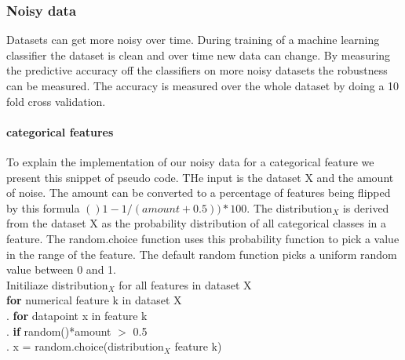 \documentclass[a4paper,10pt]{article}
\begin{document}
\subsubsection{Noisy data}
Datasets can get more noisy over time. During training of a machine learning classifier the dataset is clean and over time new data can change. By measuring the predictive accuracy off the classifiers on more noisy datasets the robustness can be measured. The accuracy is measured over the whole dataset by doing a 10 fold cross validation.

\paragraph{categorical features \newline}
To explain the implementation of our noisy data for a categorical feature we present this snippet of pseudo code. THe input is the dataset X and the amount of noise. The amount can be converted to a percentage of features being flipped by this formula $()1-1/(amount+0.5))*100$. The distribution$_X$ is derived from the dataset X as the probability distribution of all categorical classes in a feature. The random.choice function uses this probability function to pick a value in the range of the feature. The default random function picks a uniform random value between 0 and 1.  \\
Initiliaze distribution$_X$ for all features in dataset X\\
\textbf{for} numerical feature k in dataset X\\
.\hspace{1cm} \textbf{for} datapoint x in feature k\\
.\hspace{2cm} \textbf{if} random()*amount $>$ 0.5 \\	
.\hspace{3cm} x = random.choice(distribution$_X$ feature k) 
\\
\end{document}
